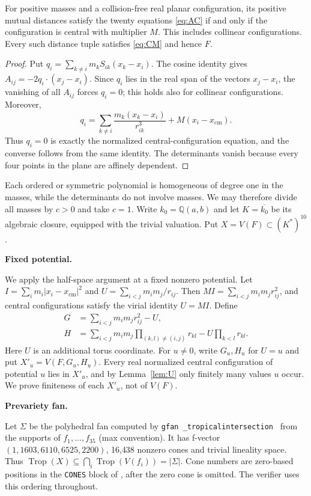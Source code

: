\documentclass[11pt]{amsart}
\newcommand{\topic}[1]{\par\addvspace{1.4ex}\noindent\textbf{#1}\par\nobreak\smallskip\noindent}
\theoremstyle{definition}\newtheorem{definition}[theorem]{Definition}\theoremstyle{remark}\newtheorem{remark}[theorem]{Remark}
\newcommand{\Trop}{\operatorname{Trop}}\newcommand{\inn}{\operatorname{in}}\newcommand{\Q}{\mathbb{Q}}
\begin{document}
\begin{lemma}\label{lem:physical}
For positive masses and a collision-free real planar configuration, its positive mutual distances satisfy the twenty equations \eqref{eq:AC} if and only if the configuration is central with multiplier $M$. This includes collinear configurations. Every such distance tuple satisfies \eqref{eq:CM} and hence $F$.
\end{lemma}
\begin{proof}
Put $q_i=\sum_{k\ne i}m_k S_{ik}(x_k-x_i)$. The cosine identity gives
$A_{ij}=-2q_i\cdot(x_j-x_i)$. Since $q_i$ lies in the real span of the vectors $x_j-x_i$, the vanishing of all $A_{ij}$ forces $q_i=0$; this holds also for collinear configurations. Moreover,
\[
 q_i=\sum_{k\ne i}\frac{m_k(x_k-x_i)}{r_{ik}^3}
       +M(x_i-x_{\mathrm{cm}}).
\]
Thus $q_i=0$ is exactly the normalized central-configuration equation, and the converse follows from the same identity. The determinants vanish because every four points in the plane are affinely dependent.
\end{proof}
Each ordered or symmetric polynomial is homogeneous of degree one in the masses, while the determinants do not involve masses. We may therefore divide all masses by $c>0$ and take $c=1$. Write $k_0=\Q(a,b)$ and let $K=\overline{k_0}$ be its algebraic closure, equipped with the trivial valuation. Put $X=V(F)\subset(K^*)^{10}$.

\topic{Fixed potential.} We apply the half-space argument at a fixed nonzero potential. Let $I=\sum_i m_i|x_i-x_{\mathrm{cm}}|^2$ and $U=\sum_{i<j}m_im_j/r_{ij}$. Then $MI=\sum_{i<j}m_im_jr_{ij}^2$, and central configurations satisfy the virial identity $U=MI$. Define
\[
 \begin{aligned}
 G&=\sum_{i<j}m_im_jr_{ij}^2-U,\\
 H&=\sum_{i<j}m_im_j\prod_{(k,l)\ne(i,j)}r_{kl}
       -U\prod_{k<l}r_{kl}.
 \end{aligned}
\]
Here $U$ is an additional torus coordinate. For $u\ne0$, write $G_u,H_u$ for $U=u$ and put $X'_u=V(F,G_u,H_u)$. Every real normalized central configuration of potential $u$ lies in $X'_u$, and by Lemma~\ref{lem:U} only finitely many values $u$ occur. We prove finiteness of each $X'_u$, not of $V(F)$.

\topic{Prevariety fan.} Let $\Sigma$ be the polyhedral fan computed by \texttt{gfan \_tropicalintersection}~\citep{gfan} from the supports
of $f_1,\dots,f_{35}$ (max convention). It has f-vector $(1,1603,6110,6525,2200)$, 16{,}438 nonzero cones and
trivial lineality space. Thus $\Trop(X)\subseteq\bigcap_i \Trop(V(f_i))=|\Sigma|$. Cone numbers are zero-based positions in the \texttt{CONES} block of , after the zero cone is omitted. The verifier uses this ordering throughout.
\end{document}
